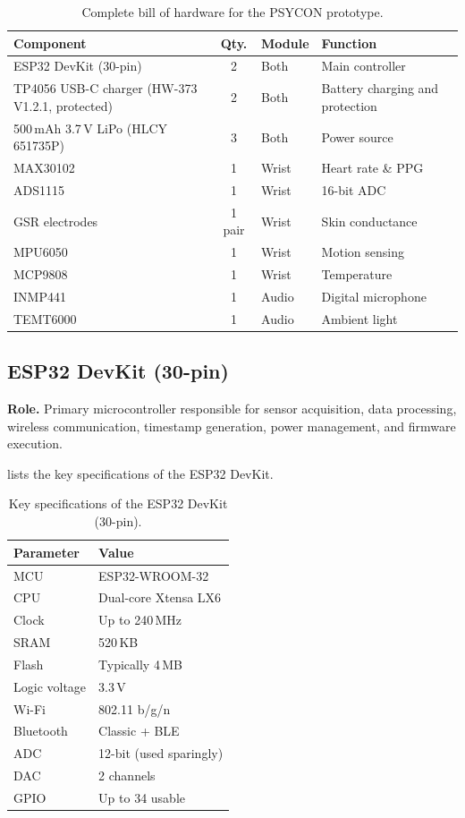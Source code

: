 \begin{table}[t]
\centering
\caption{Complete bill of hardware for the PSYCON prototype.}
\label{tab:bill-of-hardware}
\small
\begin{tabularx}{\textwidth}{@{}Y c l Y@{}}
\toprule
\textbf{Component} & \textbf{Qty.} & \textbf{Module} & \textbf{Function} \\
\midrule
ESP32 DevKit (30-pin) & 2 & Both & Main controller \\
TP4056 USB-C charger (HW-373 V1.2.1, protected) & 2 & Both & Battery charging and protection \\
500\,mAh 3.7\,V LiPo (HLCY 651735P) & 3 & Both & Power source \\
MAX30102 & 1 & Wrist & Heart rate \& PPG \\
ADS1115 & 1 & Wrist & 16-bit ADC \\
GSR electrodes & 1 pair & Wrist & Skin conductance \\
MPU6050 & 1 & Wrist & Motion sensing \\
MCP9808 & 1 & Wrist & Temperature \\
INMP441 & 1 & Audio & Digital microphone \\
TEMT6000 & 1 & Audio & Ambient light \\
\bottomrule
\end{tabularx}
\end{table}

\subsection{ESP32 DevKit (30-pin)}
\label{sec:esp32-devkit}

\textbf{Role.} Primary microcontroller responsible for sensor acquisition, data processing, wireless communication, timestamp generation, power management, and firmware execution.

 lists the key specifications of the ESP32 DevKit.

\begin{table}[H]
\centering
\caption{Key specifications of the ESP32 DevKit (30-pin).}
\label{tab:esp32-specs}
\small
\begin{tabularx}{\columnwidth}{@{}l Y@{}}
\toprule
\textbf{Parameter} & \textbf{Value} \\
\midrule
MCU & ESP32-WROOM-32 \\
CPU & Dual-core Xtensa LX6 \\
Clock & Up to 240\,MHz \\
SRAM & 520\,KB \\
Flash & Typically 4\,MB \\
Logic voltage & 3.3\,V \\
Wi-Fi & 802.11 b/g/n \\
Bluetooth & Classic + BLE \\
ADC & 12-bit (used sparingly) \\
DAC & 2 channels \\
GPIO & Up to 34 usable \\
\bottomrule
\end{tabularx}
\end{table}

